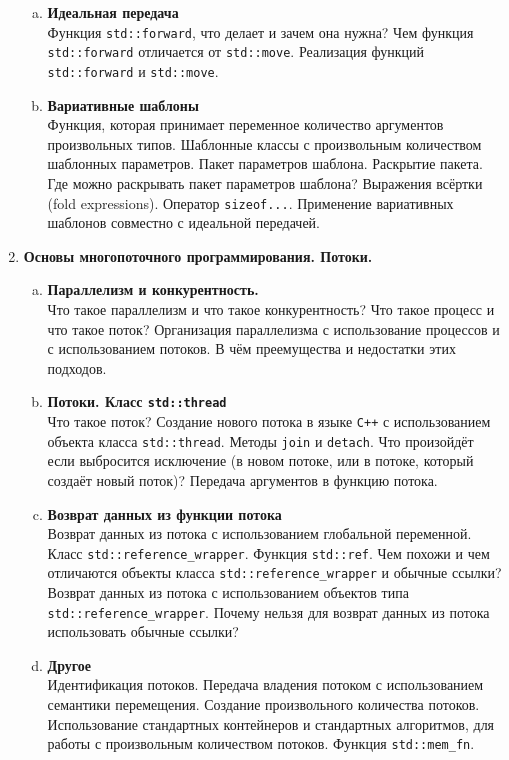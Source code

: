 \documentclass{article}
\begin{document}
\begin{enumerate}
\begin{enumerate}[a.]
\item \textbf{Идеальная передача}\\
Функция \texttt{std::forward}, что делает и зачем она нужна? Чем функция \texttt{std::forward} отличается от \texttt{std::move}. Реализация функций \texttt{std::forward} и \texttt{std::move}.

\item \textbf{Вариативные шаблоны}\\
Функция, которая принимает переменное количество аргументов произвольных типов. Шаблонные классы с произвольным количеством шаблонных параметров. Пакет параметров шаблона. Раскрытие пакета. Где можно раскрывать пакет параметров шаблона? Выражения всёртки (fold expressions). Оператор \texttt{sizeof...}. Применение вариативных шаблонов совместно с идеальной передачей.

\end{enumerate}

\item \textbf{Основы многопоточного программирования. Потоки.}
\begin{enumerate}[a.]
\item \textbf{Параллелизм и конкурентность.}\\
Что такое параллелизм и что такое конкурентность? Что такое процесс и что такое поток? Организация параллелизма с использование процессов и с использованием потоков. В чём преемущества и недостатки этих подходов.

\item \textbf{Потоки. Класс \texttt{std::thread}}\\
Что такое поток? Создание нового потока в языке \texttt{C++} с использованием объекта класса \texttt{std::thread}. Методы \texttt{join} и \texttt{detach}. Что произойдёт если выбросится исключение (в новом потоке, или в потоке, который создаёт новый поток)?  Передача аргументов в функцию потока. 

\item \textbf{Возврат данных из функции потока}\\
Возврат данных из потока с использованием глобальной переменной. Класс \texttt{std::reference\_wrapper}. Функция \texttt{std::ref}. Чем похожи и чем отличаются объекты класса \texttt{std::reference\_wrapper} и обычные ссылки? Возврат данных из потока с использованием объектов типа \texttt{std::reference\_wrapper}. Почему нельзя для возврат данных из потока использовать обычные ссылки? 

\item \textbf{Другое}\\
Идентификация потоков. Передача владения потоком с использованием семантики перемещения. Создание произвольного количества потоков. Использование стандартных контейнеров и стандартных алгоритмов, для работы с произвольным количеством потоков. Функция \texttt{std::mem\_fn}.
\end{enumerate}



\end{enumerate}
\end{document}
